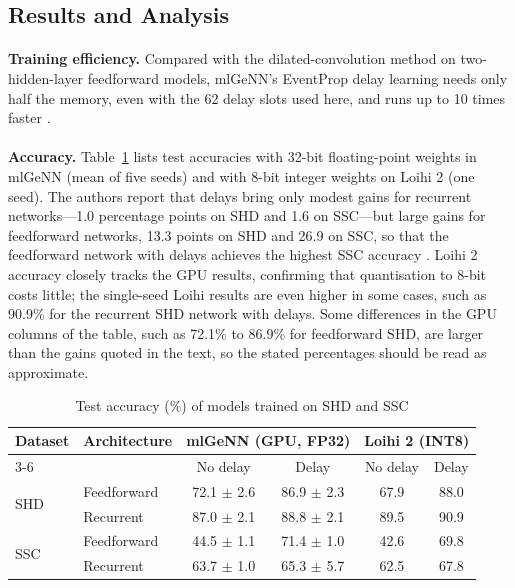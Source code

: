 \documentclass[12pt,a4paper,final]{extreport}
\begin{document}
\subsection{Results and Analysis}

\paragraph{} \textbf{Training efficiency.} Compared with the dilated-convolution method on two-hidden-layer feedforward models, mlGeNN's EventProp delay learning needs only half the memory, even with the 62 delay slots used here, and runs up to 10 times faster \cite{p1}.

\paragraph{} \textbf{Accuracy.} Table~\ref{tab:p1_acc} lists test accuracies with 32-bit floating-point weights in mlGeNN (mean of five seeds) and with 8-bit integer weights on Loihi 2 (one seed). The authors report that delays bring only modest gains for recurrent networks---1.0 percentage points on SHD and 1.6 on SSC---but large gains for feedforward networks, 13.3 points on SHD and 26.9 on SSC, so that the feedforward network with delays achieves the highest SSC accuracy \cite{p1}. Loihi 2 accuracy closely tracks the GPU results, confirming that quantisation to 8-bit costs little; the single-seed Loihi results are even higher in some cases, such as 90.9\% for the recurrent SHD network with delays. Some differences in the GPU columns of the table, such as 72.1\% to 86.9\% for feedforward SHD, are larger than the gains quoted in the text, so the stated percentages should be read as approximate.

{\renewcommand{\arraystretch}{1.15}
\begin{table}[htbp]
\centering
\caption{Test accuracy (\%) of models trained on SHD and SSC \cite{p1}}\label{tab:p1_acc}
\small
\begin{tabular}{|l|l|c|c|c|c|}
\hline
\multirow{2}{*}{\textbf{Dataset}} & \multirow{2}{*}{\textbf{Architecture}} & \multicolumn{2}{c|}{\textbf{mlGeNN (GPU, FP32)}} & \multicolumn{2}{c|}{\textbf{Loihi 2 (INT8)}} \\ \cline{3-6}
 & & No delay & Delay & No delay & Delay \\ \hline
\multirow{2}{*}{SHD} & Feedforward & 72.1 $\pm$ 2.6 & 86.9 $\pm$ 2.3 & 67.9 & 88.0 \\ \cline{2-6}
 & Recurrent & 87.0 $\pm$ 2.1 & 88.8 $\pm$ 2.1 & 89.5 & 90.9 \\ \hline
\multirow{2}{*}{SSC} & Feedforward & 44.5 $\pm$ 1.1 & 71.4 $\pm$ 1.0 & 42.6 & 69.8 \\ \cline{2-6}
 & Recurrent & 63.7 $\pm$ 1.0 & 65.3 $\pm$ 5.7 & 62.5 & 67.8 \\ \hline
\end{tabular}
\end{table}}
\end{document}
